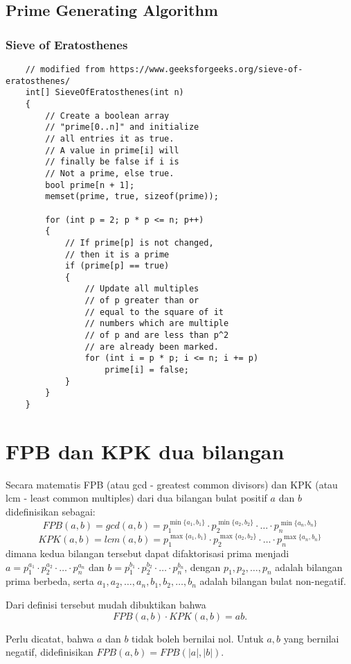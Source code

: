 \documentclass[11pt]{scrartcl}
\begin{document}
	\subsection{Prime Generating Algorithm}
	\subsubsection{Sieve of Eratosthenes}
	\begin{lstlisting}
	// modified from https://www.geeksforgeeks.org/sieve-of-eratosthenes/
	int[] SieveOfEratosthenes(int n)
	{
	    // Create a boolean array
	    // "prime[0..n]" and initialize
	    // all entries it as true.
	    // A value in prime[i] will
	    // finally be false if i is
	    // Not a prime, else true.
	    bool prime[n + 1];
	    memset(prime, true, sizeof(prime));
	 
	    for (int p = 2; p * p <= n; p++)
	    {
	        // If prime[p] is not changed,
	        // then it is a prime
	        if (prime[p] == true)
	        {
	            // Update all multiples
	            // of p greater than or
	            // equal to the square of it
	            // numbers which are multiple
	            // of p and are less than p^2
	            // are already been marked.
	            for (int i = p * p; i <= n; i += p)
	                prime[i] = false;
	        }
	    }
	}
	\end{lstlisting}
	
	
  	\section{FPB dan KPK dua bilangan}
	 Secara matematis FPB (atau gcd - greatest common divisors) dan KPK (atau lcm - least common multiples) dari dua bilangan bulat positif $a$ dan $b$ 
	 didefinisikan sebagai:
	 $$FPB(a,b) = gcd(a,b) = p_1^{\min\{a_1,b_1\}}\cdot p_2^{\min\{a_2,b_2\}} \cdot \ldots \cdot p_n^{\min\{a_n,b_n\}}$$
	 $$KPK(a,b) = lcm(a,b) =p_1^{\max\{a_1,b_1\}}\cdot p_2^{\max\{a_2,b_2\}} \cdot \ldots \cdot p_n^{\max\{a_n,b_n\}}$$
	 dimana kedua bilangan tersebut dapat difaktorisasi prima menjadi
	 $a=p_1^{a_1}\cdot p_2^{a_2}\cdot \ldots \cdot p_n^{a_n}$ dan $b=p_1^{b_1}\cdot p_2^{b_2} \cdot \ldots \cdot p_n^{b_n}$, dengan $p_1,p_2,\dots,p_n$ adalah bilangan prima berbeda, serta $a_1,a_2,\dots,a_n,b_1,b_2,\dots,b_n$ adalah bilangan bulat non-negatif.
	 
	 Dari definisi tersebut mudah dibuktikan bahwa
	 $$FPB(a,b) \cdot KPK(a,b) = ab.$$
	 
	 Perlu dicatat, bahwa $a$ dan $b$ tidak boleh bernilai nol. Untuk $a,b$ yang bernilai negatif, didefinisikan $FPB(a,b) = FPB(|a|,|b|)$.
	 
\end{document}
